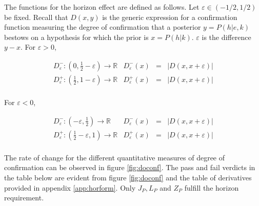 \documentclass[11pt]{article}
\begin{document}
The functions for the horizon effect are defined as follows. Let
$\varepsilon\in{}(-1/2,1/2)$ be fixed. Recall that $D(x,y)$ is the
generic expression for a confirmation function measuring the degree of
confirmation that a posterior $y=P(h|e,k)$ bestows on a hypothesis for
which the prior is $x=P(h|k)$. $\varepsilon$ is the difference $y-x$.
For $\varepsilon>0$,

\begin{equation}
  \begin{array}{lrcl}
  D_{\varepsilon}^{-}:(0,\frac{1}{2}-\varepsilon)\rightarrow{}\mathbb{R} & D_{\varepsilon}^{-}(x)&=&|D(x,x+\varepsilon)| \\
  D_{\varepsilon}^{+}:(\frac{1}{2},1-\varepsilon)\rightarrow{}\mathbb{R} & D_{\varepsilon}^{+}(x)&=&|D(x,x+\varepsilon)| \\
  \end{array}
  \label{eq:defdhpos}
\end{equation}

For $\varepsilon<0$,

\begin{equation}
  \begin{array}{lrcl}
  D_{\varepsilon}^{-}:(-\varepsilon,\frac{1}{2})\rightarrow{}\mathbb{R} & D_{\varepsilon}^{-}(x)&=&|D(x,x+\varepsilon)| \\
  D_{\varepsilon}^{+}:(\frac{1}{2}-\varepsilon,1)\rightarrow{}\mathbb{R} & D_{\varepsilon}^{+}(x)&=&|D(x,x+\varepsilon)| \\
  \end{array}
  \label{eq:defdhneg}
\end{equation}

The rate of change for the different quantitative measures of degree
of confirmation can be observed in figure \ref{fig:doconf}. The pass
and fail verdicts in the table below are evident from figure
\ref{fig:doconf} and the table of derivatives provided in appendix
\ref{app:horform}. Only $J_{P},L_{P}$ and $Z_{P}$ fulfill the horizon
requirement.
\end{document}
